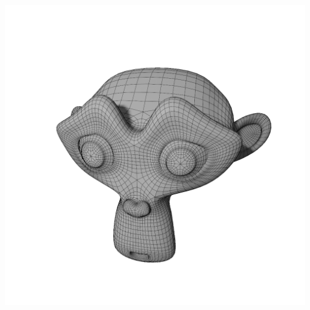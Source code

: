 \documentclass[11pt,class=report,crop=false]{standalone}
\begin{document}
\begin{center}
	\includegraphics[scale=\myscale,scale=0.18,trim={5cm 0 4cm 0},clip,]{figures/singe-new-02}
	\hspace*{-20mm}
\end{center}
\end{document}

